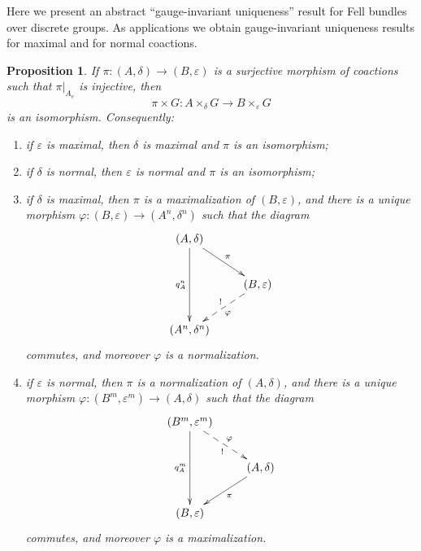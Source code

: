 \documentclass[12pt]{amsart}
\theoremstyle{plain}
\newtheorem{prop}[theorem]{Proposition}
\theoremstyle{remark}
\theoremstyle{definition}
\numberwithin{equation}{section}
\theoremstyle{plain}
\theoremstyle{definition}
\theoremstyle{remark}
\begin{document}
Here we present an abstract ``gauge-invariant uniqueness'' result for Fell bundles over discrete groups.
As applications we obtain gauge-invariant uniqueness results for maximal and for normal coactions.

\begin{prop}
\label{GIUTFB}
If $\pi:(A,\delta)\to (B,\varepsilon)$ is a surjective morphism of coactions such that
$\pi|_{A_e}$ is injective, then
\[
\pi\times G:A\times_\delta G\to B\times_\varepsilon G
\]
is an isomorphism.
Consequently:
\begin{enumerate}
\item\label{it:epsilon-max} if $\varepsilon$ is maximal, then $\delta$ is maximal and $\pi$ is an
isomorphism;

\item\label{it:delta-normal} if $\delta$ is normal, then $\varepsilon$ is normal and $\pi$ is an
isomorphism;

\item\label{it:delta-max} if $\delta$ is maximal, then $\pi$ is a maximalization of $(B,\varepsilon)$, and there is a unique morphism $\varphi:(B,\varepsilon)\to (A^n,\delta^n)$ such that
the diagram
\begin{equation}\label{A.1(3)}
\xymatrix{
(A,\delta) \ar[dr]^\pi \ar[dd]_{q_A^n}
\\
&(B,\varepsilon) \ar@{-->}[dl]^\varphi_{!}
\\
(A^n,\delta^n)
}
\end{equation}
commutes,
and moreover $\varphi$ is a normalization.

\item\label{it:epsilon-normal} if $\varepsilon$ is normal, then $\pi$ is a normalization of $(A,\delta)$, and there is a unique morphism $\varphi:(B^m,\varepsilon^m)\to (A,\delta)$ such that
the diagram
\begin{equation}\label{A.1(4)}
\xymatrix{
(B^m,\varepsilon^m) \ar@{-->}[dr]^\varphi_{!} \ar[dd]_{q_A^m}
\\
&(A,\delta) \ar[dl]^\pi
\\
(B,\varepsilon)
}
\end{equation}
commutes,
and moreover $\varphi$ is a maximalization.
\end{enumerate}
\end{prop}
\end{document}
